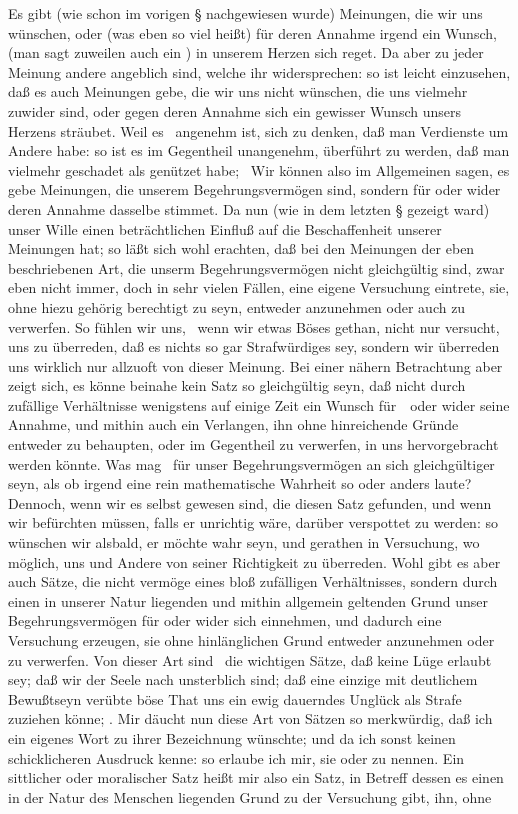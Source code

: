 Es gibt (wie schon im vorigen § nachgewiesen wurde) Meinungen, die wir uns wünschen, oder (was eben so viel heißt) für deren Annahme irgend ein Wunsch, (man sagt zuweilen auch ein ) in unserem Herzen sich reget. Da aber zu jeder Meinung andere angeblich sind, welche ihr widersprechen: so ist leicht einzusehen, daß es auch Meinungen gebe, die wir uns nicht wünschen, die uns vielmehr zuwider sind, oder gegen deren Annahme sich ein gewisser Wunsch unsers Herzens sträubet. Weil es \zB\ angenehm ist, sich zu denken, daß man Verdienste um Andere habe: so ist es im Gegentheil unangenehm, überführt zu werden, daß man vielmehr geschadet als genützet habe; \udgl\ Wir können also im Allgemeinen sagen, es gebe Meinungen, die unserem Begehrungsvermögen  sind, sondern für oder wider deren Annahme dasselbe stimmet. Da nun (wie in dem letzten § gezeigt ward) unser Wille einen beträchtlichen Einfluß auf die Beschaffenheit unserer Meinungen hat; so läßt sich wohl erachten, daß bei den Meinungen der eben beschriebenen Art, die unserm Begehrungsvermögen nicht gleichgültig sind, zwar eben nicht immer, doch in sehr vielen Fällen, eine eigene Versuchung eintrete, sie, ohne hiezu gehörig berechtigt zu seyn, entweder anzunehmen oder auch zu verwerfen. So fühlen wir uns, \zB\ wenn wir etwas Böses gethan, nicht nur versucht, uns zu überreden, daß es nichts so gar Strafwürdiges sey, sondern wir überreden uns wirklich nur allzuoft von dieser Meinung. Bei einer nähern Betrachtung aber zeigt sich, es könne beinahe kein Satz so gleichgültig seyn, daß nicht durch zufällige Verhältnisse wenigstens auf einige Zeit ein Wunsch für~\ oder wider seine Annahme, und mithin auch ein Verlangen, ihn ohne hinreichende Gründe entweder zu behaupten, oder im Gegentheil zu verwerfen, in uns hervorgebracht werden könnte. Was mag \zB\ für unser Begehrungsvermögen an sich gleichgültiger seyn, als ob irgend eine rein mathematische Wahrheit so oder anders laute? Dennoch, wenn wir es selbst gewesen sind, die diesen Satz gefunden, und wenn wir befürchten müssen, falls er unrichtig wäre, darüber verspottet zu werden: so wünschen wir alsbald, er möchte wahr seyn, und gerathen in Versuchung, wo möglich, uns und Andere von seiner Richtigkeit zu überreden. Wohl gibt es aber auch Sätze, die nicht vermöge eines bloß zufälligen Verhältnisses, sondern durch einen in unserer Natur liegenden und mithin allgemein geltenden Grund unser Begehrungsvermögen für oder wider sich einnehmen, und dadurch eine Versuchung erzeugen, sie ohne hinlänglichen Grund entweder anzunehmen oder zu verwerfen. Von dieser Art sind \zB\ die wichtigen Sätze, daß keine Lüge erlaubt sey; daß wir der Seele nach unsterblich sind; daß eine einzige mit deutlichem Bewußtseyn verübte böse That uns ein ewig dauerndes Unglück als Strafe zuziehen könne; \udgl. Mir däucht nun diese Art von Sätzen so merkwürdig, daß ich ein eigenes Wort zu ihrer Bezeichnung wünschte; und da ich sonst keinen schicklicheren Ausdruck kenne: so erlaube ich mir, sie  oder  zu nennen. Ein sittlicher oder moralischer Satz heißt mir also ein Satz, in Betreff dessen es einen in der Natur des Menschen liegenden Grund zu der Versuchung gibt, ihn, ohne 